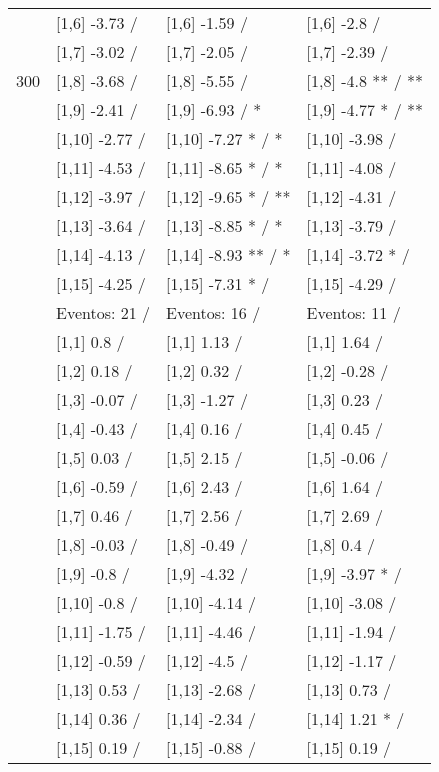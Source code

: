 \begin{table}
\begin{tabular}[t]{llll}
 & {}[1,6] -3.73  / & {}[1,6] -1.59  / & {}[1,6] -2.8  /\\
 & {}[1,7] -3.02  / & {}[1,7] -2.05  / & {}[1,7] -2.39  /\\
300 & {}[1,8] -3.68  / & {}[1,8] -5.55  / & {}[1,8] -4.8 ** / **\\
\addlinespace
 & {}[1,9] -2.41  / & {}[1,9] -6.93  / * & {}[1,9] -4.77 * / **\\
 & {}[1,10] -2.77  / & {}[1,10] -7.27 * / * & {}[1,10] -3.98  /\\
 & {}[1,11] -4.53  / & {}[1,11] -8.65 * / * & {}[1,11] -4.08  /\\
 & {}[1,12] -3.97  / & {}[1,12] -9.65 * / ** & {}[1,12] -4.31  /\\
 & {}[1,13] -3.64  / & {}[1,13] -8.85 * / * & {}[1,13] -3.79  /\\
\addlinespace
 & {}[1,14] -4.13  / & {}[1,14] -8.93 ** / * & {}[1,14] -3.72 * /\\
 & {}[1,15] -4.25  / & {}[1,15] -7.31 * / & {}[1,15] -4.29  /\\
 & Eventos:  21 / & Eventos:  16 / & Eventos:  11 /\\
 & {}[1,1] 0.8  / & {}[1,1] 1.13  / & {}[1,1] 1.64  /\\
 & {}[1,2] 0.18  / & {}[1,2] 0.32  / & {}[1,2] -0.28  /\\
\addlinespace
 & {}[1,3] -0.07  / & {}[1,3] -1.27  / & {}[1,3] 0.23  /\\
 & {}[1,4] -0.43  / & {}[1,4] 0.16  / & {}[1,4] 0.45  /\\
 & {}[1,5] 0.03  / & {}[1,5] 2.15  / & {}[1,5] -0.06  /\\
 & {}[1,6] -0.59  / & {}[1,6] 2.43  / & {}[1,6] 1.64  /\\
 & {}[1,7] 0.46  / & {}[1,7] 2.56  / & {}[1,7] 2.69  /\\
\addlinespace
500 & {}[1,8] -0.03  / & {}[1,8] -0.49  / & {}[1,8] 0.4  /\\
 & {}[1,9] -0.8  / & {}[1,9] -4.32  / & {}[1,9] -3.97 * /\\
 & {}[1,10] -0.8  / & {}[1,10] -4.14  / & {}[1,10] -3.08  /\\
 & {}[1,11] -1.75  / & {}[1,11] -4.46  / & {}[1,11] -1.94  /\\
 & {}[1,12] -0.59  / & {}[1,12] -4.5  / & {}[1,12] -1.17  /\\
\addlinespace
 & {}[1,13] 0.53  / & {}[1,13] -2.68  / & {}[1,13] 0.73  /\\
 & {}[1,14] 0.36  / & {}[1,14] -2.34  / & {}[1,14] 1.21 * /\\
 & {}[1,15] 0.19  / & {}[1,15] -0.88  / & {}[1,15] 0.19  /\\
\bottomrule
\end{tabular}
\end{table}
